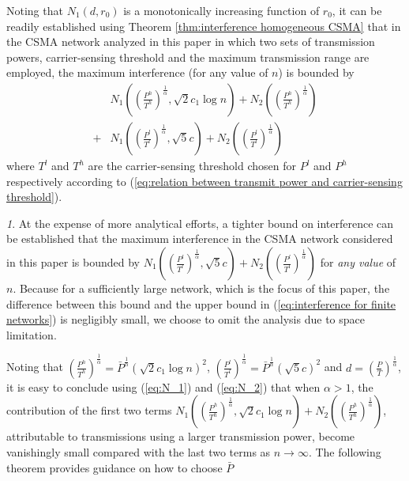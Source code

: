 \documentclass[english]{IEEEtran}
\theoremstyle{plain}
\theoremstyle{plain}
\theoremstyle{plain}
\theoremstyle{remark}
\newtheorem{rem}[thm]{\protect\remarkname}
\providecommand{\remarkname}{Remark}
\begin{document}
Noting that $N_{1}\left(d,r_{0}\right)$ is a monotonically increasing
function of $r_{0}$, it can be readily established using Theorem
\ref{thm:interference homogeneous CSMA} that in the CSMA network
analyzed in this paper in which two sets of transmission powers, carrier-sensing
threshold and the maximum transmission range are employed, the maximum
interference (for any value of $n$) is bounded by
\begin{align}
 & N_{1}\left(\left(\frac{P^{h}}{T^{h}}\right)^{\frac{1}{\alpha}},\sqrt{2}c_{1}\log n\right)+N_{2}\left(\left(\frac{P^{h}}{T^{h}}\right)^{\frac{1}{\alpha}}\right)\nonumber \\
+ & N_{1}\left(\left(\frac{P^{l}}{T^{l}}\right)^{\frac{1}{\alpha}},\sqrt{5}c\right)+N_{2}\left(\left(\frac{P^{l}}{T^{l}}\right)^{\frac{1}{\alpha}}\right)\label{eq:interference for finite networks}
\end{align}
where $T^{l}$ and $T^{h}$ are the carrier-sensing threshold chosen
for $P^{l}$ and $P^{h}$ respectively according to (\ref{eq:relation between transmit power and carrier-sensing threshold}). 
\begin{rem}
At the expense of more analytical efforts, a tighter bound on interference
can be established that the maximum interference in the CSMA network
considered in this paper is bounded by $N_{1}\left(\left(\frac{P^{l}}{T^{l}}\right)^{\frac{1}{\alpha}},\sqrt{5}c\right)+N_{2}\left(\left(\frac{P^{l}}{T^{l}}\right)^{\frac{1}{\alpha}}\right)$
for \emph{any value} of $n$. Because for a sufficiently large network,
which is the focus of this paper, the difference between this bound
and the upper bound in (\ref{eq:interference for finite networks})
is negligibly small, we choose to omit the analysis due to space limitation.
\end{rem}
Noting that $\left(\frac{P^{h}}{T^{h}}\right)^{\frac{1}{\alpha}}=\bar{P}^{\frac{1}{\alpha}}\left(\sqrt{2}c_{1}\log n\right)^{2}$,
$\left(\frac{P^{l}}{T^{l}}\right)^{\frac{1}{\alpha}}=\bar{P}^{\frac{1}{\alpha}}\left(\sqrt{5}c\right)^{2}$
and $d=\left(\frac{P}{T}\right)^{\frac{1}{\alpha}}$, it is easy to
conclude using (\ref{eq:N_1}) and (\ref{eq:N_2}) that when $\alpha>1$,
the contribution of the first two terms $N_{1}\left(\left(\frac{P^{h}}{T^{h}}\right)^{\frac{1}{\alpha}},\sqrt{2}c_{1}\log n\right)+N_{2}\left(\left(\frac{P^{h}}{T^{h}}\right)^{\frac{1}{\alpha}}\right)$,
attributable to transmissions using a larger transmission power, become
vanishingly small compared with the last two terms as $n\rightarrow\infty$.
The following theorem provides guidance on how to choose $\bar{P}$
\end{document}
